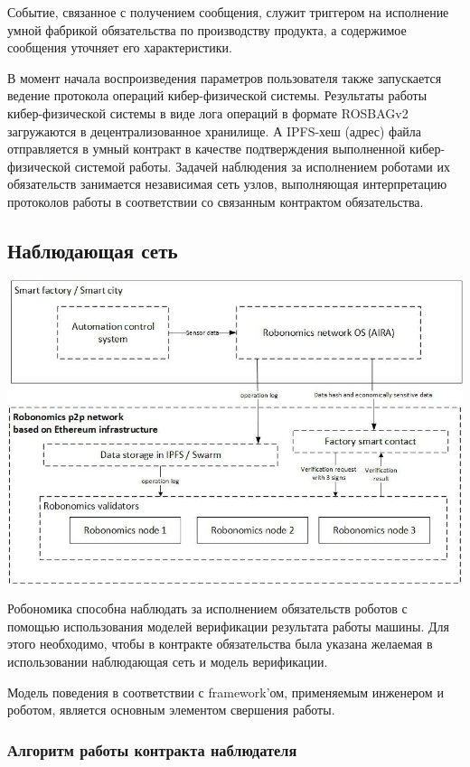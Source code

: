\documentclass{article}
\begin{document}
Событие, связанное с получением сообщения, служит триггером на исполнение умной фабрикой обязательства по производству продукта, а содержимое сообщения уточняет его характеристики.

В момент начала воспроизведения параметров пользователя также запускается ведение протокола операций кибер-физической системы. Результаты работы кибер-физической системы в виде лога операций в формате ROSBAGv2 загружаются в децентрализованное хранилище. А IPFS-хеш (адрес) файла отправляется в умный контракт в качестве подтверждения выполненной кибер-физической системой работы. Задачей наблюдения за исполнением роботами их обязательств занимается независимая сеть узлов, выполняющая интерпретацию протоколов работы в соответствии со связанным контрактом обязательства.

\subsection{Наблюдающая сеть}

\includegraphics[width=1\textwidth]{app-3.png} 

Робономика способна наблюдать за исполнением обязательств роботов с помощью использования моделей верификации результата работы машины. Для этого необходимо, чтобы в контракте обязательства была указана желаемая в использовании наблюдающая сеть и модель верификации.

Модель поведения в соответствии с framework'ом, применяемым инженером и роботом, является основным элементом свершения работы.  

\subsubsection{Алгоритм работы контракта наблюдателя}
\end{document}
